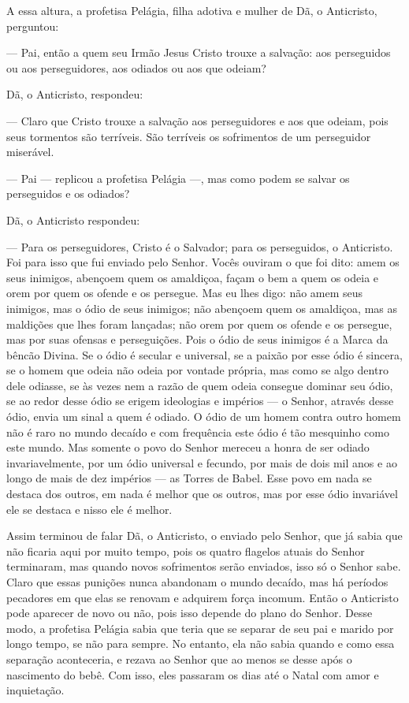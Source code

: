 A essa altura, a profetisa Pelágia, filha adotiva e mulher de Dã, o
Anticristo, perguntou:

--- Pai, então a quem seu Irmão Jesus Cristo trouxe a salvação: aos
perseguidos ou aos perseguidores, aos odiados ou aos que odeiam?

Dã, o Anticristo, respondeu:

--- Claro que Cristo trouxe a salvação aos perseguidores e aos que
odeiam, pois seus tormentos são terríveis. São terríveis os sofrimentos
de um perseguidor miserável.

--- Pai --- replicou a profetisa Pelágia ---, mas como podem se salvar
os perseguidos e os odiados?

Dã, o Anticristo respondeu:

--- Para os perseguidores, Cristo é o Salvador; para os perseguidos, o
Anticristo. Foi para isso que fui enviado pelo Senhor. Vocês ouviram o
que foi dito: amem os seus inimigos, abençoem quem os amaldiçoa, façam o
bem a quem os odeia e orem por quem os ofende e os persegue. Mas eu lhes
digo: não amem seus inimigos, mas o ódio de seus inimigos; não abençoem
quem os amaldiçoa, mas as maldições que lhes foram lançadas; não orem
por quem os ofende e os persegue, mas por suas ofensas e perseguições.
Pois o ódio de seus inimigos é a Marca da bêncão Divina. Se o ódio é
secular e universal, se a paixão por esse ódio é sincera, se o homem que
odeia não odeia por vontade própria, mas como se algo dentro dele
odiasse, se às vezes nem a razão de quem odeia consegue dominar seu
ódio, se ao redor desse ódio se erigem ideologias e impérios --- o
Senhor, através desse ódio, envia um sinal a quem é odiado. O ódio de um
homem contra outro homem não é raro no mundo decaído e com frequência
este ódio é tão mesquinho como este mundo. Mas somente o povo do Senhor
mereceu a honra de ser odiado invariavelmente, por um ódio universal e
fecundo, por mais de dois mil anos e ao longo de mais de dez impérios
--- as Torres de Babel. Esse povo em nada se destaca dos outros, em nada
é melhor que os outros, mas por esse ódio invariável ele se destaca e
nisso ele é melhor.

Assim terminou de falar Dã, o Anticristo, o enviado pelo Senhor, que já
sabia que não ficaria aqui por muito tempo, pois os quatro flagelos
atuais do Senhor terminaram, mas quando novos sofrimentos serão
enviados, isso só o Senhor sabe. Claro que essas punições nunca
abandonam o mundo decaído, mas há períodos pecadores em que elas se
renovam e adquirem força incomum. Então o Anticristo pode aparecer de
novo ou não, pois isso depende do plano do Senhor. Desse modo, a
profetisa Pelágia sabia que teria que se separar de seu pai e marido por
longo tempo, se não para sempre. No entanto, ela não sabia quando e como
essa separação aconteceria, e rezava ao Senhor que ao menos se desse
após o nascimento do bebê. Com isso, eles passaram os dias até o Natal
com amor e inquietação.

